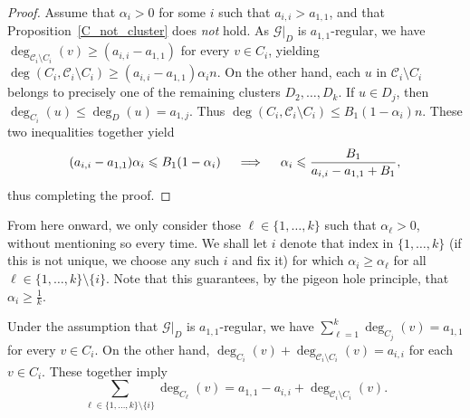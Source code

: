 \documentclass[11pt,reqno]{amsart}
\theoremstyle{definition}
\theoremstyle{remark}
\theoremstyle{conjecture}
\begin{document}
\begin{proof}
Assume that $\alpha_{i} > 0$ for some $i$ such that $a_{i,i} > a_{1,1}$, and that Proposition~\ref{C_not_cluster} does \emph{not} hold. As $\mathcal{G}|_{D}$ is $a_{1,1}$-regular, we have $\deg_{\mathcal{C}_{i} \setminus C_{i}}(v) \geqslant (a_{i,i} - a_{1,1})$ for every $v \in C_{i}$, yielding $\deg(C_{i}, \mathcal{C}_{i} \setminus C_{i}) \geqslant (a_{i,i} - a_{1,1}) \alpha_{i} n$. On the other hand, each $u$ in $\mathcal{C}_{i} \setminus C_{i}$ belongs to precisely one of the remaining clusters $D_{2}, \ldots, D_{k}$. If $u \in D_{j}$, then $\deg_{C_{i}}(u) \leqslant \deg_{D}(u) = a_{1,j}$. Thus $\deg(C_{i}, \mathcal{C}_{i} \setminus C_{i}) \leqslant B_{1} (1-\alpha_{i}) n$. These two inequalities together yield
\begin{equation}\label{better_bound_on_alpha_{i}}
(a_{i,i} - a_{1,1}) \alpha_{i} \leqslant B_{1} (1-\alpha_{i}) \quad \implies \quad \alpha_{i} \leqslant \frac{B_{1}}{a_{i,i} - a_{1,1} + B_{1}}, \nonumber
\end{equation}
thus completing the proof.
\end{proof}

From here onward, we only consider those $\ell \in \{1, \ldots, k\}$ such that $\alpha_{\ell} > 0$, without mentioning so every time. We shall let $i$ denote that index in $\{1, \ldots, k\}$ (if this is not unique, we choose any such $i$ and fix it) for which $\alpha_{i} \geqslant \alpha_{\ell}$ for all $\ell \in \{1, \ldots, k\} \setminus \{i\}$. Note that this guarantees, by the pigeon hole principle, that $\alpha_{i} \geqslant \frac{1}{k}$. 

Under the assumption that $\mathcal{G}|_{D}$ is $a_{1,1}$-regular, we have $\sum_{\ell=1}^{k} \deg_{C_{j}}(v) = a_{1,1}$ for every $v \in C_{i}$. On the other hand, $\deg_{C_{i}}(v) + \deg_{\mathcal{C}_{i} \setminus C_{i}}(v) = a_{i,i}$ for each $v \in C_{i}$. These together imply
\begin{equation}\label{degree_identity}
\sum_{\ell \in \{1, \ldots, k\} \setminus \{i\}} \deg_{C_{\ell}}(v) = a_{1,1} - a_{i,i} + \deg_{\mathcal{C}_{i} \setminus C_{i}}(v).
\end{equation}
\end{document}
